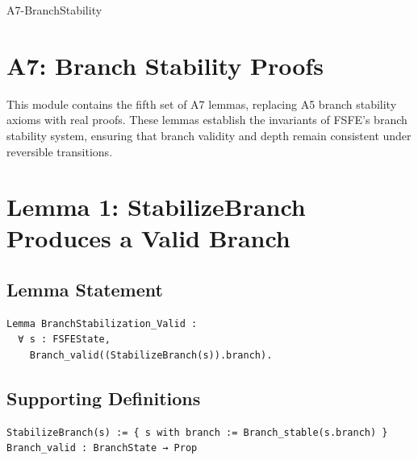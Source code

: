 \documentclass[11pt]{article}
\begin{document}


\begin{citationmembrane}{A7-BranchStability}
\end{citationmembrane}

\section*{A7: Branch Stability Proofs}

This module contains the fifth set of A7 lemmas, replacing A5 branch stability
axioms with real proofs. These lemmas establish the invariants of FSFE’s branch
stability system, ensuring that branch validity and depth remain consistent
under reversible transitions.

\newpage


\section{Lemma 1: StabilizeBranch Produces a Valid Branch}

\subsection{Lemma Statement}

\begin{verbatim}
Lemma BranchStabilization_Valid :
  ∀ s : FSFEState,
    Branch_valid((StabilizeBranch(s)).branch).
\end{verbatim}

\subsection{Supporting Definitions}

\begin{verbatim}
StabilizeBranch(s) := { s with branch := Branch_stable(s.branch) }
Branch_valid : BranchState → Prop
\end{verbatim}
\end{document}
